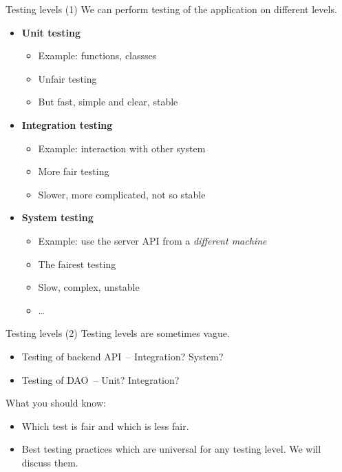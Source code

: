 \documentclass[aspectratio=169]{beamer}
\begin{document}
\begin{frame}{Testing levels (1)}
  We can perform testing of the application on different levels.
  \begin{itemize}
    \item \textbf{Unit testing}
      \begin{itemize}
        \item Example: functions, classses
        \item Unfair testing
        \item But fast, simple and clear, stable
      \end{itemize}
    \pause
    \item \textbf{Integration testing}
      \begin{itemize}
        \item Example: interaction with other system
        \item More fair testing
        \item Slower, more complicated, not so stable
      \end{itemize}
    \pause
    \item \textbf{System testing}
      \begin{itemize}
        \item Example: use the server API from a \textit{different machine}
        \item The fairest testing
        \item Slow, complex, unstable
        \item \ldots
      \end{itemize}
  \end{itemize}
\end{frame}

\begin{frame}{Testing levels (2)}
  Testing levels are sometimes vague.
  \begin{itemize}
    \item Testing of backend API~-- Integration? System?
    \item Testing of DAO~-- Unit? Integration?
  \end{itemize}
  \pause
  \bigskip
  What you should know:
  \begin{itemize}
    \item Which test is fair and which is less fair.
    \item Best testing practices which are universal for any testing level.
          We will discuss them.
  \end{itemize}
\end{frame}
\end{document}
